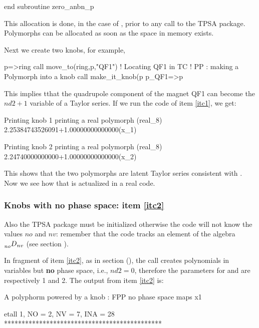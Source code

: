 \documentclass{hitec}     %
\begin{document}
{\begin{code}
  end subroutine zero_anbn_p
\end{code}

This allocation is done, in the case of , prior to any call to the TPSA package. Polymorphs can be allocated as soon as the space in memory exists.

Next we create two knobs, for example,

\begin{code}
p=>ring%
call move_to(ring,p,"QF1")   !  Locating QF1 in TC
!  PP : making a Polymorph into a knob
call make_it_knob(p%
p_QF1=>p
\end{code}

This implies tthat the quadrupole component  of the magnet QF1 can become the $nd2+1$ variable of a Taylor series. If we run the code of item \ref{itc1}, we get:

\begin{code}
 Printing knob 1
  printing a real polymorph (real_8)
2.25384743526091+1.00000000000000(x_1)

 Printing knob 2
  printing a real polymorph (real_8)
2.24740000000000+1.00000000000000(x_2)
\end{code}

This shows that the two polymorphs are latent Taylor series consistent with . Now we see how that is actualized in a real code.

\subsubsection{Knobs with no phase space: item \ref{itc2}}
\label{s:initigno}


 Also the TPSA package must be initialized otherwise the code will not know the values $no$ and  $nv$: remember that the code tracks an element of the algebra $\prescript{}{no}{D}_{nv}$ (see section ).

In fragment of item \ref{itc2},  as in section (), the call  creates polynomials in  variables but {\bf no} phase space, i.e., $nd2=0$, therefore the parameters for  and  are respectively 1 and 2.  The output from item \ref{itc2} is:

\renewcommand{\codefont}{\footnotesize}
\begin{code}
 A polyphorm powered by a knob : FPP no phase space maps
  x1

 etall    1, NO =    2, NV =    7, INA =   28
 *********************************************


\end{code}}
\end{document}
